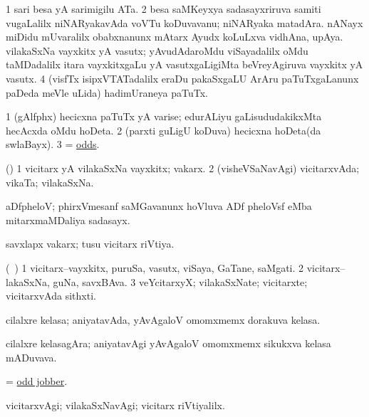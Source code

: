 \noindent
\gl{\pagu}
\bmng
\bnum
\num{1}  sari besa yA sarimigilu ATa. 
\num{2}  besa saMKeyxya sadasayxriruva samiti \mo vugaLalilx niNARyakavAda voVTu koDuvavanu; niNARyaka matadAra. 
  
\banum
{} nANayx miDidu mUvaralilx obabxnanunx mAtarx Ayudx koLuLxva vidhAna, upAya. 
 vilakaSxNa vayxkitx yA vasutx; yAvudAdaroMdu viSayadalilx oMdu taMDadalilx itara vayxkitxgaLu yA vasutxgaLigiMta beVreyAgiruva vayxkitx yA vasutx. 
\eanum
\numie
\num{4}  (visfTx isipxVTATadalilx eraDu pakaSxgaLU ArAru paTuTxgaLanunx paDeda meVle uLida) hadimUraneya paTuTx. 
\enum
\emng
\eentry

\bentry
{}
\gl{\nA}
\bmng
\bnum
\num{1} (gAlfphx) hecicxna paTuTx yA varise; edurALiyu gaLisududakikxMta hecAcxda oMdu hoDeta. 
\num{2} (parxti guLigU koDuva) hecicxna hoDeta(da swlaBayx). 
\num{3} = \hyperlink{odds}{odds}. 
\enum
\emng
\eentry

\bentry
{}
\gl{\nA}
\bmng
(\AmA) 
\bnum
\num{1} vicitarx yA vilakaSxNa vayxkitx; vakarx. 
\num{2} (visheVSaNavAgi) vicitarxvAda; vikaTa; vilakaSxNa. 
\enum
\emng
\eentry

\bentry
{}
\gl{\nA}
\bmng
aDfpheloV; phirxVmesanf saMGavanunx hoVluva ADf pheloVsf eMba mitarxmaMDaliya sadasayx. 
\emng
\eentry

\bentry
{}
\gl{\gu}
\bmng
savxlapx vakarx; tusu vicitarx riVtiya. 
\emng
\eentry

\bentry
{}
\gl{\nA}
\bmng
(\bava\ ) 
\bnum
\num{1} vicitarx--vayxkitx, puruSa, vasutx, viSaya, GaTane, saMgati. 
\num{2} vicitarx--lakaSxNa, guNa, savxBAva. 
\num{3} veYcitarxyX; vilakaSxNate; vicitarxte; vicitarxvAda sithxti. 
\enum
\emng
\eentry

\bentry
{}
\gl{\nA}
\bmng
cilalxre kelasa; aniyatavAda, yAvAgaloV omomxmemx dorakuva kelasa. 
\emng
\eentry

\bentry
{}
\gl{\nA}
\bmng
cilalxre kelasagAra; aniyatavAgi yAvAgaloV omomxmemx sikukxva kelasa mADuvava. 
\emng
\eentry

\bentry
{}
\gl{\nA}
\bmng
= \hyperlink{odd jobber}{odd jobber}. 
\emng
\eentry

\bentry
{}
\gl{\kirxvi}
\bmng
vicitarxvAgi; vilakaSxNavAgi; vicitarx riVtiyalilx. 
\emng
\eentry

